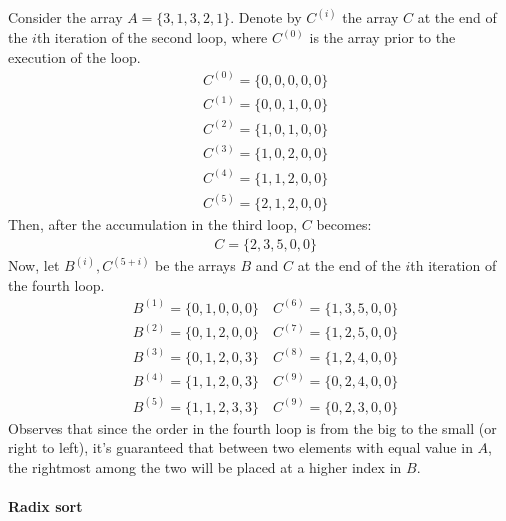 \begin{example}
Consider the array $A = \{ 3,1,3,2,1 \}$. Denote by $C^{(i)}$ the array $C$ at the end of the $i$th iteration of the second loop, where $C^{(0)}$ is the array prior to the execution of the loop.
  \begin{equation*}
    \begin{split}
       & C^{(0)} = \{0,0,0,0,0 \}  \\ 
       & C^{(1)} = \{0,0,1,0,0 \}  \\ 
       & C^{(2)} = \{1,0,1,0,0 \}  \\ 
       & C^{(3)} = \{1,0,2,0,0 \}  \\ 
       & C^{(4)} = \{1,1,2,0,0 \}  \\ 
       & C^{(5)} = \{2,1,2,0,0 \}  
    \end{split}
  \end{equation*}
Then, after the accumulation in the third loop, $C$ becomes:
  \begin{equation*}
    \begin{split}
       & C = \{2,3,5,0,0 \}  
    \end{split}
  \end{equation*}
Now, let $B^{(i)}, C^{(5+i)}$ be the arrays $B$ and $C$ at the end of the $i$th iteration of the fourth loop.
  \begin{equation*}
    \begin{split}
      & B^{(1)} =  \{0,1,0,0,0 \}  \quad C^{(6)} = \{1,3,5,0,0 \}  \\
      & B^{(2)} =  \{0,1,2,0,0 \}  \quad C^{(7)} = \{1,2,5,0,0 \}  \\
      & B^{(3)} =  \{0,1,2,0,3 \}  \quad C^{(8)} = \{1,2,4,0,0 \}  \\
      & B^{(4)} =  \{1,1,2,0,3 \}  \quad C^{(9)} = \{0,2,4,0,0 \}  \\
      & B^{(5)} =  \{1,1,2,3,3 \}  \quad C^{(9)} = \{0,2,3,0,0 \} 
    \end{split}
  \end{equation*}
Observes that since the order in the fourth loop is from the big to the small (or right to left), it's guaranteed that between two elements with equal value in $A$, the rightmost among the two will be placed at a higher index in $B$.
\end{example}

\paragraph{Radix sort}

